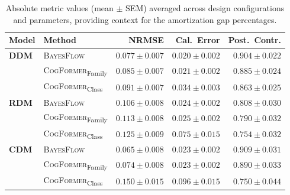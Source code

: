 \begin{table}[ht]
\centering
\small
\caption{Absolute metric values (mean $\pm$ SEM) averaged across design configurations and parameters, providing context for the amortization gap percentages.}
\label{tab:absolute-metrics}
\begin{tabular}{llrrr}
\toprule
\textbf{Model} & \textbf{Method} & NRMSE & Cal.\ Error & Post.\ Contr. \\
\midrule
\textbf{DDM} & \textsc{BayesFlow} & $0.077 \pm 0.007$ & $0.020 \pm 0.002$ & $0.904 \pm 0.022$ \\
 & \textsc{CogFormer}\textsubscript{Family} & $0.085 \pm 0.007$ & $0.021 \pm 0.002$ & $0.885 \pm 0.024$ \\
 & \textsc{CogFormer}\textsubscript{Class} & $0.091 \pm 0.007$ & $0.034 \pm 0.003$ & $0.863 \pm 0.025$ \\
\midrule
\textbf{RDM} & \textsc{BayesFlow} & $0.106 \pm 0.008$ & $0.024 \pm 0.002$ & $0.808 \pm 0.030$ \\
 & \textsc{CogFormer}\textsubscript{Family} & $0.113 \pm 0.008$ & $0.025 \pm 0.002$ & $0.790 \pm 0.032$ \\
 & \textsc{CogFormer}\textsubscript{Class} & $0.125 \pm 0.009$ & $0.075 \pm 0.015$ & $0.754 \pm 0.032$ \\
\midrule
\textbf{CDM} & \textsc{BayesFlow} & $0.065 \pm 0.008$ & $0.023 \pm 0.002$ & $0.909 \pm 0.031$ \\
 & \textsc{CogFormer}\textsubscript{Family} & $0.074 \pm 0.008$ & $0.023 \pm 0.002$ & $0.890 \pm 0.033$ \\
 & \textsc{CogFormer}\textsubscript{Class} & $0.150 \pm 0.015$ & $0.096 \pm 0.015$ & $0.750 \pm 0.044$ \\
\bottomrule
\end{tabular}
\end{table}